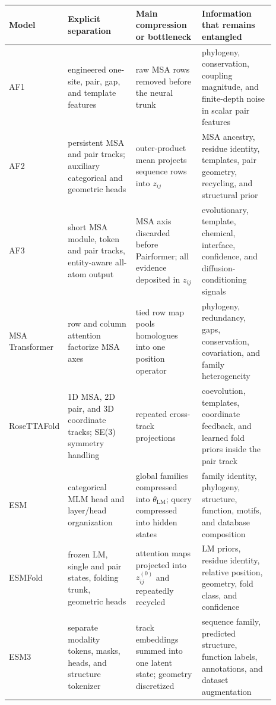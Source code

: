 \documentclass[10pt]{article}
\begin{document}
\begin{center}
\scriptsize
\begin{tabular}{>{\raggedright\arraybackslash}p{0.09\linewidth}
                >{\raggedright\arraybackslash}p{0.26\linewidth}
                >{\raggedright\arraybackslash}p{0.25\linewidth}
                >{\raggedright\arraybackslash}p{0.29\linewidth}}
\toprule
Model & Explicit separation & Main compression or bottleneck & Information that remains entangled \\
\midrule
AF1 & engineered one-site, pair, gap, and template features & raw MSA rows removed before the neural trunk & phylogeny, conservation, coupling magnitude, and finite-depth noise in scalar pair features \\
AF2 & persistent MSA and pair tracks; auxiliary categorical and geometric heads & outer-product mean projects sequence rows into $z_{ij}$ & MSA ancestry, residue identity, templates, pair geometry, recycling, and structural prior \\
AF3 & short MSA module, token and pair tracks, entity-aware all-atom output & MSA axis discarded before Pairformer; all evidence deposited in $z_{ij}$ & evolutionary, template, chemical, interface, confidence, and diffusion-conditioning signals \\
MSA Transformer & row and column attention factorize MSA axes & tied row map pools homologues into one position operator & phylogeny, redundancy, gaps, conservation, covariation, and family heterogeneity \\
RoseTTA\hspace{0pt}Fold & 1D MSA, 2D pair, and 3D coordinate tracks; SE(3) symmetry handling & repeated cross-track projections & coevolution, templates, coordinate feedback, and learned fold priors inside the pair track \\
ESM & categorical MLM head and layer/head organization & global families compressed into $\theta_{\mathrm{LM}}$; query compressed into hidden states & family identity, phylogeny, structure, function, motifs, and database composition \\
ESMFold & frozen LM, single and pair states, folding trunk, geometric heads & attention maps projected into $z_{ij}^{(0)}$ and repeatedly recycled & LM priors, residue identity, relative position, geometry, fold class, and confidence \\
ESM3 & separate modality tokens, masks, heads, and structure tokenizer & track embeddings summed into one latent state; geometry discretized & sequence family, predicted structure, function labels, annotations, and dataset augmentation \\
\bottomrule
\end{tabular}
\end{center}
\end{document}
